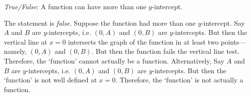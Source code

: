 \documentclass[11pt,letterpaper]{article}
\begin{document}
\quizsol \textit{True/False}: A function can have more than one $y$-intercept. \pspace

\sol The statement is \textit{false}. Suppose the function had more than one $y$-intercept. Say $A$ and $B$ are $y$-intercepts, i.e. $(0, A)$ and $(0, B)$ are $y$-intercepts. But then the vertical line at $x= 0$ intersects the graph of the function in at least two points---namely, $(0, A)$ and $(0, B)$. But then the function fails the vertical line test. Therefore, the `function' cannot actually be a function. Alternatively, Say $A$ and $B$ are $y$-intercepts, i.e. $(0, A)$ and $(0, B)$ are $y$-intercepts. But then the `function' is not well defined at $x= 0$. Therefore, the `function' is not actually a function. \pvspace{1.3cm}
\end{document}
